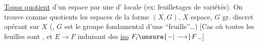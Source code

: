 
\uline{Topos quotient} d'un espace  par une
 d' locale 
(ex: feuilletages de variétés). On trouve comme
quotients les espaces de la forme $(X,G)$, $X$ espace, $G$ gr. 
discret opérant sur $X$ (,
$G$ est le groupe fondamental d'une ``feuille''\ldots)
[Cas où toutes les feuilles  sont ,
et  $E\longrightarrow F$ induisant des
\uline{iso} $F_i\unsure{-|\longrightarrow}F$\ldots]

